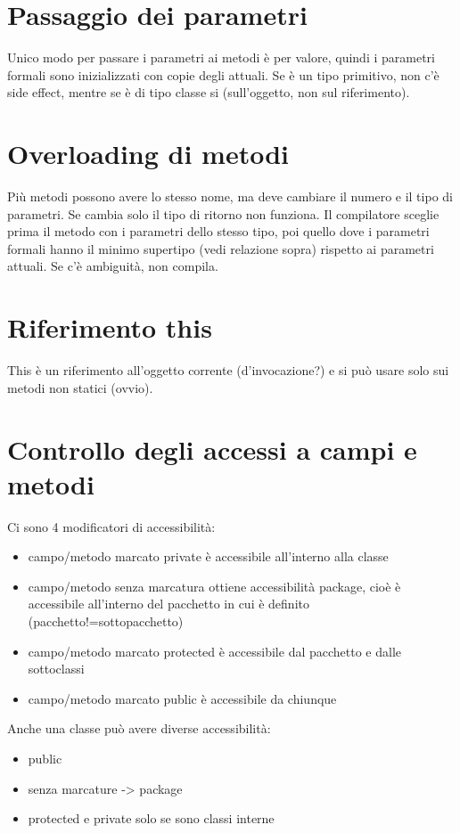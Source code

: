 \section{Passaggio dei parametri}
Unico modo per passare i parametri ai metodi è per valore, quindi i parametri formali sono inizializzati con copie degli attuali. Se è un tipo primitivo, non c'è side effect, mentre se è di tipo classe si (sull'oggetto, non sul riferimento).

\section{Overloading di metodi}
Più metodi possono avere lo stesso nome, ma deve cambiare il numero e il tipo di parametri. Se cambia solo il tipo di ritorno non funziona.
Il compilatore sceglie prima il metodo con i parametri dello stesso tipo, poi quello dove i parametri formali hanno il minimo supertipo (vedi relazione sopra) rispetto ai parametri attuali.
Se c'è ambiguità, non compila.

\section{Riferimento this}
This è un riferimento all'oggetto corrente (d'invocazione?) e si può usare solo sui metodi non statici (ovvio).

\section{Controllo degli accessi a campi e metodi}
Ci sono 4 modificatori di accessibilità:
\begin{itemize}

\item campo/metodo marcato private è accessibile all'interno alla classe
\item campo/metodo senza marcatura ottiene accessibilità package, cioè è accessibile all'interno del pacchetto in cui è definito (pacchetto!=sottopacchetto)
\item campo/metodo marcato protected è accessibile dal pacchetto e dalle sottoclassi
\item campo/metodo marcato public è accessibile da chiunque
\end{itemize}

Anche una classe può avere diverse accessibilità:
\begin{itemize}
\item public
\item senza marcature -> package
\item protected e private solo se sono classi interne
\end{itemize}

